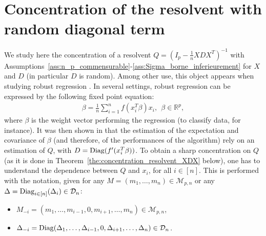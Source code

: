 \documentclass[a4papaer, titlepage]{book}
\begin{document}
\chapter{Concentration of the resolvent with random diagonal term}\label{cha:deterministic_equivalent_I_m_XDX}

We study here the concentration of a resolvent $Q =(I_p - \frac{1}{n}XDX^T)^{-1}$ with Assumptions~\ref{ass:n_p_commensurable}-\ref{ass:Sigma_borne_inferieurement} for $X$ and $D$ (in particular $D$ is random). Among other use, this object appears when studying robust regression \cite{ELK13, MAI19}. 
In several settings, robust regression can be expressed by the following fixed point equation:
\begin{align}\label{eq:point_fixe_robust}
   \beta = \frac{1}{n} \sum_{i=1}^n f(x_i^T\beta)x_i, \ \ \beta \in \mathbb R^p,
 \end{align} 
where $\beta$ is the weight vector performing the regression (to classify data, for instance).
It was then shown in \cite{SED21} that the estimation of the expectation and covariance of $\beta$ (and therefore, of the performances of the algorithm) rely on an estimation of $Q$, with $D = \operatorname{Diag}(f'(x_i^T\beta))$.
To obtain a sharp concentration on $Q$ (as it is done in Theorem~\ref{the:concentration_resolvent_XDX} below), one has to understand the dependence between $Q$ and $x_i$, for all $i\in[n]$. This is performed with the notation, given for any $M = (m_1,\ldots, m_n)\in \mathcal M_{p,n}$ or any $\Delta = \operatorname{Diag}_{i\in[n]}(\Delta_i) \in \mathcal D_n$:
\begin{itemize}
  \item $M_{-i} = (m_1,\ldots, m_{i-1}, 0, m_{i+1},\ldots, m_n) \in \mathcal M_{p,n}$,
  \item $\Delta_{-i} = \operatorname{Diag}  (\Delta_1,\ldots, \Delta_{i-1}, 0, \Delta_{i+1},\ldots, \Delta_n) \in \mathcal D_n$.
\end{itemize}
\end{document}
